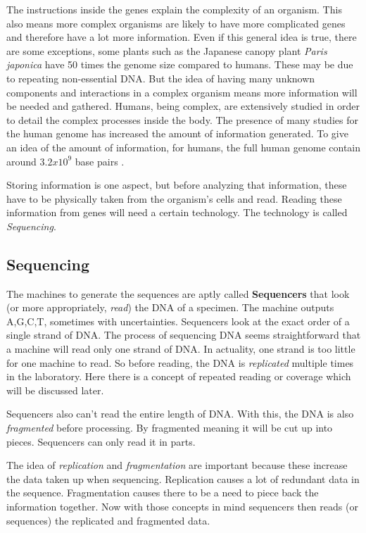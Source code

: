 \documentclass[acmsmall]{acmart}
\begin{document}
The instructions inside the genes explain the complexity of an organism. This also means more complex organisms are likely to have more complicated genes and therefore have a lot more information. Even if this general idea is true, there are some exceptions, some plants such as the Japanese canopy plant \textit{Paris japonica} have 50 times the genome size compared to humans\cite[~p.442]{campbell}. These may be due to repeating non-essential DNA. But the idea of having many unknown components and interactions in a complex organism means more information will be needed and gathered. Humans, being complex, are extensively studied in order to detail the complex processes inside the body. The presence of many studies for the human genome has increased the amount of information generated. To give an idea of the amount of information, for humans, the full human genome contain around $3.2x10^9$ base pairs \cite{introgenomics}. 

Storing information is one aspect, but before analyzing that information, these have to be physically taken from the organism's cells and read. Reading these information from genes will need a certain technology. The technology is called \textit{Sequencing}.

\subsection{Sequencing}

The machines to generate the sequences are aptly called \textbf{Sequencers} that look (or more appropriately, \textit{read}) the DNA of a specimen. The machine outputs A,G,C,T, sometimes with uncertainties. Sequencers look at the exact order of a single strand of DNA. The process of sequencing DNA seems straightforward that a machine will read only one strand of DNA. In actuality, one strand is too little for one machine to read. So before reading, the DNA is \textit{replicated} multiple times in the laboratory. Here there is a concept of repeated reading or coverage which will be discussed later.

Sequencers also can't read the entire length of DNA. With this, the DNA is also \textit{fragmented} before processing. By fragmented meaning it will be cut up into pieces. Sequencers can only read it in parts. 

The idea of \textit{replication} and \textit{fragmentation} are important because these increase the data taken up when sequencing. Replication causes a lot of redundant data in the sequence. Fragmentation causes there to be a need to piece back the information together. Now with those concepts in mind sequencers then reads (or sequences) the replicated and fragmented data.
\end{document}
